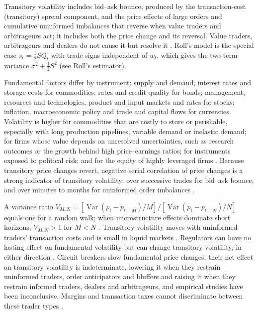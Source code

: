 \begin{qfdefinition}
Transitory volatility includes bid--ask bounce, produced by the transaction-cost (transitory) spread component, and the price effects of large orders and cumulative uninformed imbalances that reverse when value traders and arbitrageurs act; it includes both the price change and its reversal. Value traders, arbitrageurs and dealers do not cause it but resolve it \citep[same chap., pp.~413--414]{alpha-harris}. Roll's model is the special case $s_t=\tfrac12SQ_t$ with trade signs independent of $w_t$, which gives the two-term variance $\sigma^2+\tfrac12S^2$ (see \hyperref[res:roll-spread-estimator]{Roll's estimator}).

 Fundamental factors differ by instrument: supply and demand, interest rates and storage costs for commodities; rates and credit quality for bonds; management, resources and technologies, product and input markets and rates for stocks; inflation, macroeconomic policy and trade and capital flows for currencies. Volatility is higher for commodities that are costly to store or perishable, especially with long production pipelines, variable demand or inelastic demand; for firms whose value depends on unresolved uncertainties, such as research outcomes or the growth behind high price--earnings ratios; for instruments exposed to political risk; and for the equity of highly leveraged firms \citep[same chap., pp.~411--413]{alpha-harris}. Because transitory price changes revert, negative serial correlation of price changes is a strong indicator of transitory volatility: over successive trades for bid--ask bounce, and over minutes to months for uninformed order imbalances \citep[same chap., p.~414]{alpha-harris}.

A variance ratio $V_{M,N}=[\operatorname{Var}(p_t-p_{t-M})/M]/[\operatorname{Var}(p_t-p_{t-N})/N]$ equals one for a random walk; when microstructure effects dominate short horizons, $V_{M,N}>1$ for $M<N$ \citep[sec.~8.7, eq.~(8.14), pp.~74--75]{s6-hasbrouck}. Transitory volatility moves with uninformed traders' transaction costs and is small in liquid markets \citep[chap.~``Volatility'', p.~414]{alpha-harris}. Regulators can have no lasting effect on fundamental volatility but can change transitory volatility, in either direction \citep[same chap., p.~410]{alpha-harris}. Circuit breakers slow fundamental price changes; their net effect on transitory volatility is indeterminate, lowering it when they restrain uninformed traders, order anticipators and bluffers and raising it when they restrain informed traders, dealers and arbitrageurs, and empirical studies have been inconclusive. Margins and transaction taxes cannot discriminate between these trader types \citep[chap.~``Bubbles, Crashes, and Circuit Breakers'', secs.~28.3.2--28.3.4, pp.~575--577]{alpha-harris}.


\end{qfdefinition}
